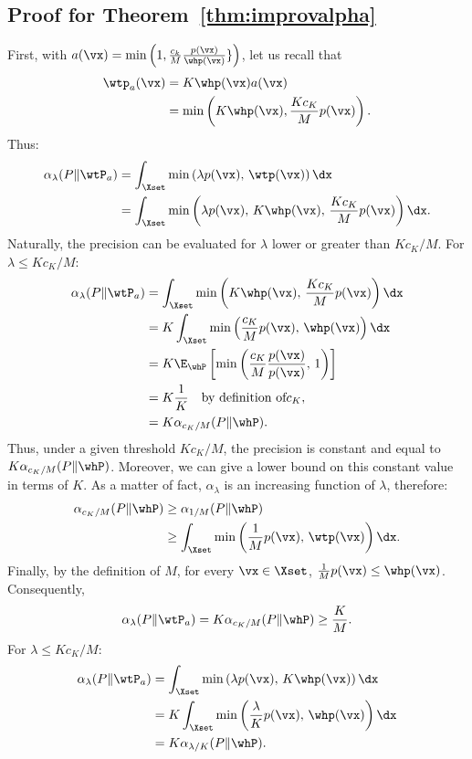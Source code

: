 \documentclass[twoside]{article}
\begin{document}
\subsection{Proof for Theorem~\ref{thm:improvalpha}}\label{app:sec:improvalpha}
First, with $a(\vx) = \min\left(1, \frac{c_k}{M}\frac{p(\vx)}{\whp(\vx)}\}\right)$, let us recall that 
\begin{align}
    \wtp_a(\vx) &= K \whp(\vx)a(\vx) \\
    & = \min \left(K\whp(\vx), \frac{Kc_K}{M}p(\vx)\right).
\end{align}
Thus:
\begin{align}
    \alpha_\lambda(P\Vert \wtP_a) &= \int_{\Xset}\min\left(\lambda p(\vx), \,\wtp(\vx)\right)\dx \\
&=  \int_{\Xset}\min\left(\lambda p(\vx), \, K\whp(\vx),\, \frac{Kc_K}{M}p(\vx) \right)\dx.
\end{align}
Naturally, the precision can be evaluated for $\lambda$ lower or greater than $Kc_K/M$. 
For $\lambda\leq Kc_K/M$:
\begin{align}
    \alpha_\lambda(P\Vert \wtP_a) &=  \int_{\Xset}\min\left( K\whp(\vx),\, \frac{Kc_K}{M}p(\vx) \right)\dx \\
    &=   K\int_{\Xset}\min\left(\frac{c_K}{M}p(\vx),\, \whp(\vx) \right)\dx \\
    &=  K \E_{\whP}\left[\min\left(\frac{c_K}{M}\frac{p(\vx)}{p(\vx)},\, 1 \right) \right]  \\
    &= K \frac{1}{K} \quad \mbox{by definition of} c_K, \\
    &=  K\alpha_{c_K/M}(P\Vert \whP).
\end{align}
Thus, under a given threshold $Kc_K/M$, the precision is constant and equal to $K\alpha_{c_K/M}(P\Vert \whP)$. Moreover, we can give a lower bound on this constant value in terms of $K$. As a matter of fact, $\alpha_\lambda$ is an increasing function of $\lambda$, therefore:
\begin{align}
    \alpha_{c_K/M}(P\Vert \whP) &\geq  \alpha_{1/M}(P\Vert \whP) \\
    &\geq  \int_{\Xset}\min\left(\frac{1}{M}p(\vx), \,\wtp(\vx)\right)\dx.
\end{align}
Finally, by the definition of $M$, for every $\vx\in\Xset$, $\frac{1}{M}p(\vx)\leq \whp(\vx)$. Consequently, 
\begin{align}
  \alpha_\lambda(P\Vert \wtP_a) =   K\alpha_{c_K/M}(P\Vert \whP) \geq \frac{K}{M}.
\end{align}
For $\lambda\leq Kc_K/M$:
\begin{align}
    \alpha_\lambda(P\Vert \wtP_a) &=  \int_{\Xset}\min\left( \lambda p(\vx),\,K\whp(\vx) \right)\dx \\
    &=   K\int_{\Xset}\min\left(\frac{\lambda}{K}p(\vx),\, \whp(\vx) \right)\dx \\
    &=  K\alpha_{\lambda/K}(P\Vert \whP). 
\end{align}
\end{document}
